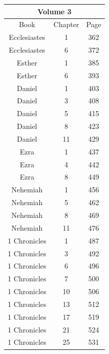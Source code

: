 \documentclass{article}
\newlength{\minipageheight}
\newlength{\minipagewidth}
\begin{document}
\begin{minipage}[r][\minipageheight][t]{\minipagewidth}%
    \begin{center}
        \renewcommand{\arraystretch}{1.0}
        \begin{tabular}{|c|c|c|}
            \hline
            \multicolumn{3}{|c|}{Volume 3} \\
            \hline
            Book         & Chapter & Page  \\
            \hline
            Ecclesiastes & 1       & 362   \\
            Ecclesiastes & 6       & 372   \\
            Esther       & 1       & 385   \\
            Esther       & 6       & 393   \\
            Daniel       & 1       & 403   \\
            Daniel       & 3       & 408   \\
            Daniel       & 5       & 415   \\
            Daniel       & 8       & 423   \\
            Daniel       & 11      & 429   \\
            Ezra         & 1       & 437   \\
            Ezra         & 4       & 442   \\
            Ezra         & 8       & 449   \\
            Nehemiah     & 1       & 456   \\
            Nehemiah     & 5       & 462   \\
            Nehemiah     & 8       & 469   \\
            Nehemiah     & 11      & 476   \\
            1 Chronicles & 1       & 487   \\
            1 Chronicles & 3       & 492   \\
            1 Chronicles & 6       & 496   \\
            1 Chronicles & 7       & 500   \\
            1 Chronicles & 10      & 506   \\
            1 Chronicles & 13      & 512   \\
            1 Chronicles & 17      & 519   \\
            1 Chronicles & 21      & 524   \\
            1 Chronicles & 25      & 531   \\

\end{tabular}
\end{center}
\end{minipage}
\end{document}
